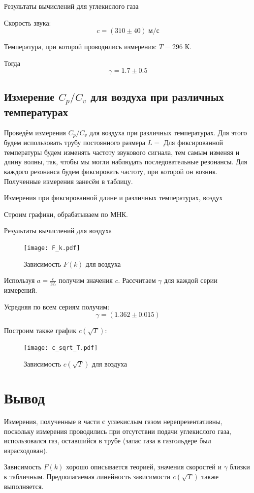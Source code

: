 \documentclass[12pt,a4paper]{article}
\begin{document}
		\begin{table}[H]
			\caption{Результаты вычислений для углекислого газа}
			
		\end{table}
		
		Скорость звука:
			$$c = (310 \pm 40) \; \text{м/с}$$
		
		Температура, при которой проводились измерения: $T = 296$ К.
		
		Тогда
			$$\gamma = 1.7 \pm 0.5$$
		
		\subsection*{Измерение $C_p/C_v$ для воздуха при различных температурах}
		
		Проведём измерения $C_p/C_v$ для воздуха при различных температурах.
		Для этого будем использовать трубу постоянного размера $L = $
		Для фиксированной температуры будем изменять частоту звукового сигнала, тем самым изменяя и длину волны, так, чтобы мы могли наблюдать последовательные резонансы.
		Для каждого резонанса будем фиксировать частоту, при которой он возник.
		Полученные измерения занесём в таблицу.
		
		\begin{table}[H]
			\caption{Измерения при фиксированной длине и различных температурах, воздух}
			
		\end{table}
		
		Строим графики, обрабатываем по МНК.
	
		\begin{table}[H]
			\caption{Результаты вычислений для воздуха}
			
		\end{table}
		
		\begin{figure}[H]
			\texttt{[image: F\_k.pdf]}
			\caption{Зависимость $F(k)$ для воздуха}
		\end{figure}
		
		Используя $a = \frac{c}{2L}$ получим значения $c$.
		Рассчитаем $\gamma$ для каждой серии измерений.
		
		Усредняя по всем сериям получим:
			$$\gamma = (1.362 \pm 0.015)$$
		
		Построим также график $c(\sqrt{T})$:
		
		\begin{figure}[H]
			\texttt{[image: c\_sqrt\_T.pdf]}
			\caption{Зависимость $c(\sqrt{T})$ для воздуха}
		\end{figure}
		
		
	\section*{Вывод}
	
		Измерения, полученные в части с углекислым газом нерепрезентативны, поскольку измерения проводились при отсутствии подачи углекислого газа, использовался газ, оставшийся в трубе (запас газа в газгольдере был израсходован).
	
		Зависимость $F(k)$ хорошо описывается теорией, значения скоростей и $\gamma$ близки к табличным. Предполагаемая линейность зависимости $c(\sqrt{T})$ также выполняется.
\end{document}
